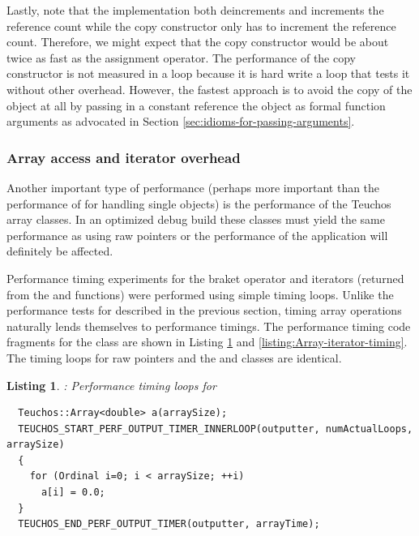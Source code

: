 \documentclass[pdf,ps2pdf,11pt]{SANDreport}
\newtheorem{listing}{Listing}
\begin{document}
Lastly, note that the {} implementation
both deincrements and increments the reference count while the copy
constructor only has to increment the reference count.  Therefore, we
might expect that the copy constructor would be about twice as fast as
the assignment operator.  The performance of the copy constructor is
not measured in a loop because it is hard write a loop that tests it
without other overhead.  However, the fastest approach is to avoid the
copy of the {} object at all by passing in a constant
reference the {} object as formal function arguments as
advocated in Section {}\ref{sec:idioms-for-passing-arguments}.


%
{}\subsubsection{Array access and iterator overhead}
\label{sec:array-overhead}
%

Another important type of performance (perhaps more important than the
performance of {} for handling single objects) is the
performance of the Teuchos array classes.  In an optimized debug build
these classes must yield the same performance as using raw pointers or
the performance of the application will definitely be affected.

Performance timing experiments for the braket operator
{} and iterators (returned from the
{} and {} functions) were performed
using simple timing loops.  Unlike the performance tests for
{} described in the previous section, timing array
operations naturally lends themselves to performance timings.  The
performance timing code fragments for the {} class are
shown in Listing {}\ref{listing:Array-bracket-timing} and
{}\ref{listing:Array-iterator-timing}.  The timing loops for raw
pointers and the {} and {} classes
are identical.


\begin{listing}: Performance timing loops for
{} \\
\label{listing:Array-bracket-timing}
{\small\begin{verbatim}
  Teuchos::Array<double> a(arraySize); 
  TEUCHOS_START_PERF_OUTPUT_TIMER_INNERLOOP(outputter, numActualLoops, arraySize) 
  { 
    for (Ordinal i=0; i < arraySize; ++i) 
      a[i] = 0.0; 
  }
  TEUCHOS_END_PERF_OUTPUT_TIMER(outputter, arrayTime); 
\end{verbatim}}
\end{listing}
\end{document}
